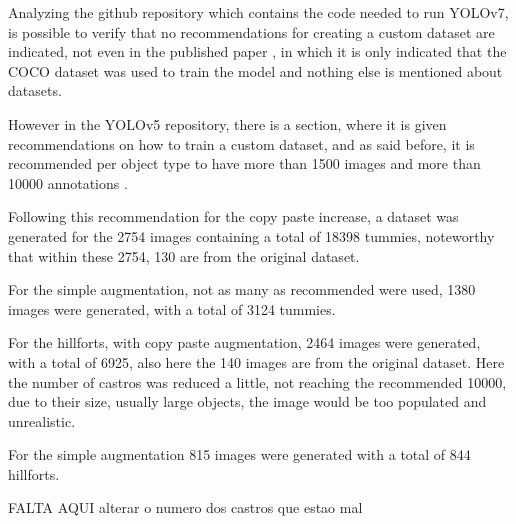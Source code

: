 Analyzing the github repository which contains the code needed to run YOLOv7, is possible to verify that no recommendations for creating a custom dataset are indicated, not even in the published paper \cite{paperyolov7}, in which it is only indicated that the COCO dataset was used to train the model and nothing else is mentioned about datasets. 

However in the YOLOv5 repository, there is a section, where it is given recommendations on how to train a custom dataset, and as said before, it is recommended per object type to have more than 1500 images and more than 10000 annotations \cite{yolov5recomedacoes}.

Following this recommendation for the copy paste increase, a dataset was generated for the 2754 images containing a total of 18398 tummies, noteworthy that within these 2754, 130 are from the original dataset.

For the simple augmentation, not as many as recommended were used, 1380 images were generated, with a total of 3124 tummies.

For the hillforts, with copy paste augmentation, 2464 images were generated, with a total of 6925, also here the 140 images are from the original dataset. Here the number of castros was reduced a little, not reaching the recommended 10000, due to their size, usually large objects, the image would be too populated and unrealistic.

For the simple augmentation 815 images were generated with a total of 844 hillforts.

FALTA AQUI alterar o numero dos castros que estao mal
